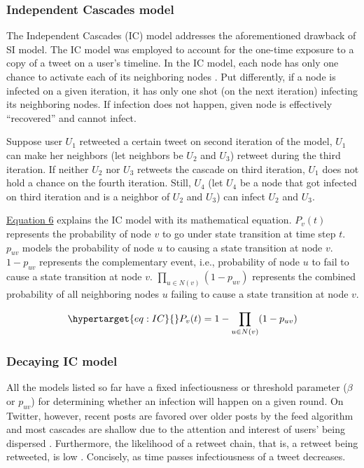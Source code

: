 \documentclass[11pt,a4paper]{article}
\begin{document}
        \subsubsection{Independent Cascades model}
        The Independent Cascades (IC) model addresses the aforementioned drawback of SI model. The IC model was employed to account for the one-time exposure to a copy of a tweet on a user's timeline. In the IC model, each node has only one chance to activate each of its neighboring nodes \cite{kempe_maximizing_2003}. Put differently, if a node is infected on a given iteration, it has only one shot (on the next iteration) infecting its neighboring nodes. If infection does not happen, given node is effectively \enquote{recovered} and cannot infect.
        
        Suppose user $U_1$ retweeted a certain tweet on second iteration of the model, $U_1$ can make her neighbors (let neighbors be $U_2$ and $U_3$) retweet during the third iteration. If neither $U_2$ nor $U_3$ retweets the cascade on third iteration, $U_1$ does not hold a chance on the fourth iteration. Still, $U_4$ (let $U_4$ be a node that got infected on third iteration and is a neighbor of $U_2$ and $U_3$) can infect $U_2$ and $U_3$.    
        
        \hyperlink{eq:IC}{Equation 6} explains the IC model with its mathematical equation. $P_v(t)$ represents the probability of node $v$ to go under state transition at time step $t$. $p_{uv}$ models the probability of node $u$ to causing a state transition at node $v$. $1-p_{uv}$ represents the complementary event, i.e., probability of node $u$ to fail to cause a state transition at node $v$. $\prod_{u \in N(v)} (1 - p_{uv})$ represents the combined probability of all neighboring nodes $u$ failing to cause a state transition at node $v$.
        
        \begin{equation}
            \hypertarget{eq:IC}{}
            P_v(t) = 1 - \prod_{u \in N(v)} (1 - p_{uv})
        \end{equation}

        \subsubsection{Decaying IC model}
        All the models listed so far have a fixed infectiousness or threshold parameter ($\beta$ or $p_{uv}$) for determining whether an infection will happen on a given round. On Twitter, however, recent posts are favored over older posts by the feed algorithm and most cascades are shallow due to the attention and interest of users' being dispersed \cite{lorenz-spreen_accelerating_2019, twitter_inc_twitters_2023}. Furthermore, the likelihood of a retweet chain, that is, a retweet being retweeted, is low \cite{goel_note_2015}. Concisely, as time passes infectiousness of a tweet decreases.
        
\end{document}
